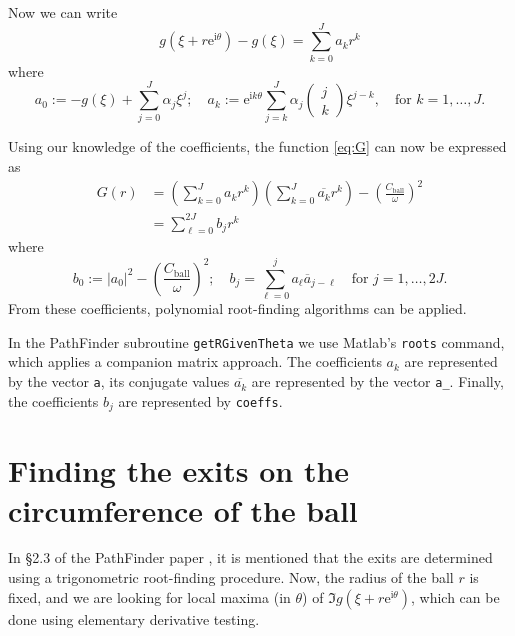 \documentclass[12pt]{article}
\newcommand{\re}{\mathrm{e}}
\newcommand{\ri}{\mathrm{i}}
\newcommand{\Cball}{C_{\mathrm{ball}}}
\begin{document}
Now we can write
\[
g(\xi+r\re^{\ri \theta})-g(\xi) = \sum_{k=0}^J a_kr^k
\]
where
\[
a_0 := -g(\xi)+\sum_{j=0}^J \alpha_j
\xi^{j};\quad
a_k := \re^{\ri k \theta}\sum_{j=k}^J \alpha_j\left(\begin{array}{c}
	j\\k
\end{array}\right)
\xi^{j-k},\quad\text{for }k=1,\ldots,J.
\]

Using our knowledge of the coefficients, the function \eqref{eq:G} can now be expressed as
\begin{align*}
G(r)&=\left(\sum_{k=0}^J a_kr^k\right)\left(\sum_{k=0}^J \overline{a_k}r^k\right) -\left(\frac{\Cball}{\omega}\right)^2\\
&=\sum_{\ell=0}^{2J} b_jr^k
\end{align*}
where
\[
b_0 := |a_0|^2 -\left(\frac{\Cball}{\omega}\right)^2; \quad b_j=\sum_{\ell=0}^{j}a_\ell\overline{a}_{j-\ell}\quad\text{for }j=1,\ldots,2J.
\]
From these coefficients, polynomial root-finding algorithms can be applied.

In the PathFinder subroutine \texttt{getRGivenTheta} we use Matlab's \texttt{roots} command, which applies a companion matrix approach. The coefficients $a_k$ are represented by the vector \texttt{a}, its conjugate values $\overline{a_k}$ are represented by the vector \texttt{a\_}. Finally, the coefficients $b_j$ are represented by \texttt{coeffs}.

\section{Finding the exits on the circumference of the ball}

In \S2.3 of the PathFinder paper \cite{PFpaper}, it is mentioned that the exits are determined using a trigonometric root-finding procedure. Now, the radius of the ball $r$ is fixed, and we are looking for local maxima (in $\theta$) of $\Im g(\xi+r\re^{\ri \theta})$, which can be done using elementary derivative testing.
\end{document}
